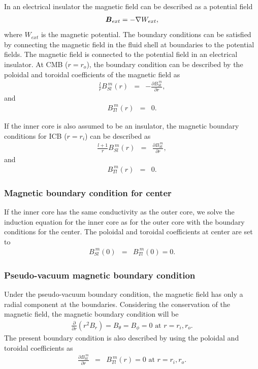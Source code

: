 In an electrical insulator the magnetic field can be described as a potential field
\begin{eqnarray}
\mbox{\boldmath$B$}_{ext} = - \nabla W_{ext},
\nonumber
\end{eqnarray}
%
where $W_{ext}$ is the magnetic potential. The boundary conditions can be satisfied by  connecting the magnetic field in the fluid shell at boundaries to the potential fields. The magnetic field is connected to the potential field in an electrical insulator. At CMB ($r = r_{o}$), the boundary condition can be described by the poloidal and toroidal coefficients of the magnetic field as
%
\begin{eqnarray}
\frac{l}{r} B_{Sl}^{\ m}(r) & = & - \frac{\partial B_{Sl}^{\ m}}{\partial r},
\nonumber
\end{eqnarray}
%
and 
%
\begin{eqnarray}
B_{Tl}^{\ m}(r) & = & 0.
\nonumber
\end{eqnarray}
%

If the inner core is also assumed to be an insulator, the magnetic boundary conditions for ICB ($r = r_{i}$) can be described as
%
\begin{eqnarray}
\frac{l+1}{r} B_{Sl}^{\ m}(r) & = & \frac{\partial B_{Sl}^{\ m}}{\partial r},
\nonumber
\end{eqnarray}
%
and 
%
\begin{eqnarray}
B_{Tl}^{\ m}(r) & = & 0.
\nonumber
\end{eqnarray}
%

\subsubsection{Magnetic boundary condition for center}
If the inner core has the same conductivity as the outer core, we solve the induction equation for the inner core as for the outer core with the boundary conditions for the center. The poloidal and toroidal coefficients at center are set to 
%
\begin{eqnarray}
B_{Sl}^{\ m}(0) &=& B_{Tl}^{\ m}(0) = 0.
\nonumber
\end{eqnarray}
%

\subsubsection{Pseudo-vacuum magnetic boundary condition}
Under the pseudo-vacuum boundary condition, the magnetic field has only a radial component at the boundaries. Considering the conservation of the magnetic field, the magnetic boundary condition will be
%
\begin{eqnarray}
\frac{\partial}{\partial r}\left(r^{2} B_{r} \right) =  B_{\theta} = B_{\phi} = 0
 \mbox{ at } r = r_{i}, r_{o}.
\nonumber
\end{eqnarray}
%
The present boundary condition is also described by using the poloidal and toroidal coefficients as
%
\begin{eqnarray}
\frac{\partial B_{Sl}^{\ m}}{\partial r} & = &  B_{Tl}^{\ m}(r) = 0
 \mbox{ at } r = r_{i}, r_{o}.
\nonumber
\end{eqnarray}

